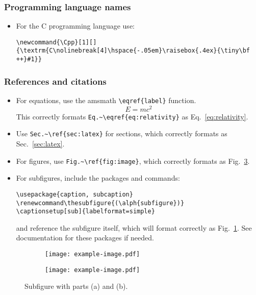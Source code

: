\documentclass[10pt, letter]{article}
\renewcommand\thesubfigure{(\alph{subfigure})}
\newcommand{\Cpp}[1][]{\textrm{C\nolinebreak[4]\hspace{-.05em}\raisebox{.4ex}{\tiny\bf
      ++}#1}}
\begin{document}
\subsubsection*{Programming language names}
\begin{itemize}
\item For the \Cpp{} programming language use:
\begin{lstlisting}
\newcommand{\Cpp}[1][]{\textrm{C\nolinebreak[4]\hspace{-.05em}\raisebox{.4ex}{\tiny\bf ++}#1}}
\end{lstlisting}
\end{itemize}

\subsubsection*{References and citations}

\begin{itemize}
\item For equations, use the amsmath \verb|\eqref{label}| function.
  \begin{equation}\label{eq:relativity}
    E = mc^2
  \end{equation}
  This correctly formats \verb|Eq.~\eqref{eq:relativity}| as
  Eq.~\eqref{eq:relativity}.
\item Use \verb|Sec.~\ref{sec:latex}| for sections, which correctly
  formats as Sec.~\ref{sec:latex}.
\item For figures, use \verb|Fig.~\ref{fig:image}|, which correctly
  formats as Fig.~\ref{fig:multifig}.
\item For subfigures, include the packages and commands:
\begin{lstlisting}
\usepackage{caption, subcaption}
\renewcommand\thesubfigure{(\alph{subfigure})}
\captionsetup[sub]{labelformat=simple}
\end{lstlisting}
and reference the subfigure itself,
which will format correctly as Fig.~\ref{fig:multifig_a}. See
documentation for these packages if needed.
\end{itemize}

\begin{figure}[h]
  \centering
  \begin{subfigure}[b]{0.2\textwidth}
    \texttt{[image: example-image.pdf]}
    \caption{}\label{fig:multifig_a}
  \end{subfigure}\hspace{10pt}
    \begin{subfigure}[b]{0.2\textwidth}
    \texttt{[image: example-image.pdf]}
    \caption{}\label{fig:multifig_b}
  \end{subfigure}
  \caption{Subfigure with parts (a) and (b).}
  \label{fig:multifig}
\end{figure}
\end{document}
